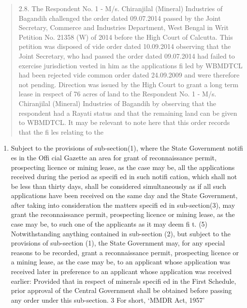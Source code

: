 \documentclass[12pt,a4paper]{article}
\newenvironment{judgequote}
  {\begin{quote}\small}
  {\end{quote}}
\begin{document}
\begin{judgequote}
2.8. The Respondent No. 1 - M/s. Chiranjilal (Mineral) Industries
of Bagandih challenged the order dated 09.07.2014 passed by the Joint
Secretary, Commerce and Industries Department, West Bengal in Writ
Petition No. 21358 (W) of 2014 before the High Court of Calcutta. This
petition was disposed of vide order dated 10.09.2014 observing that the
Joint Secretary, who had passed the order dated 09.07.2014 had failed to
exercise jurisdiction vested in him as the applications fi led by WBMDTCL
had been rejected vide common order dated 24.09.2009 and were therefore
not pending. Direction was issued by the High Court to grant a long term
lease in respect of 76 acres of land to the Respondent No. 1 - M/s. Chiranjilal
(Mineral) Industries of Bagandih by observing that the respondent had a
Rayati status and that the remaining land can be given to WBMDTCL. It may
be relevant to note here that this order records that the fi les relating to the
\end{judgequote}

\begin{enumerate}[resume]
\item Subject to the provisions of sub-section(1), where the State Government notifi es in the
Offi cial Gazette an area for grant of reconnaissance permit, prospecting licence or mining
lease, as the case may be, all the applications received during the period as specifi ed in such
notifi cation, which shall not be less than thirty days, shall be considered simultaneously
as if all such applications have been received on the same day and the State Government,
after taking into consideration the matters specifi ed in sub-section(3), may grant the
reconnaissance permit, prospecting licence or mining lease, as the case may be, to such one
of the applicants as it may deem fi t.
(5) Notwithstanding anything contained in sub-section (2), but subject to the provisions of
sub-section (1), the State Government may, for any special reasons to be recorded, grant
a reconnaissance permit, prospecting licence or a mining lease, as the case may be, to
an applicant whose application was received later in preference to an applicant whose
application was received earlier:
Provided that in respect of minerals specifi ed in the First Schedule, prior approval of the
Central Government shall be obtained before passing any order under this sub-section.
3 For short, `MMDR Act, 1957'
\end{enumerate}


\end{document}
